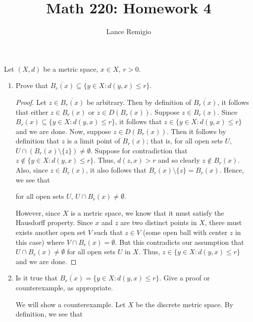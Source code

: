 \documentclass[a4paper]{article}
\title{Math 220: Homework 4}
\author{Lance Remigio}
\begin{document}
\maketitle

\begin{problem}
   Let \( (X,d) \) be a metric space, \( x \in X  \), \( r > 0  \). 
   \begin{enumerate}
       \item[(i)] Prove that \( \overline{{B}_{r}(x)} \subseteq \{ y \in X : d(y,x) \leq r  \}  \).
           \begin{proof}
               Let \( z \in \overline{{B}_{r}(x)} \) be arbitrary. Then by definition of \( \overline{{B}_{r}(x)} \), it follows that either \( z \in {B}_{r}(x)  \) or \( z \in D({B}_{r}(x)) \). Suppose \( z \in {B}_{r}(x) \). Since \( {B}_{r}(x) \subseteq \{ y \in X : d(y,x) \leq r  \}  \), it follows that \( z \in \{ y \in X : d(y,x) \leq r  \}  \) and we are done. Now, suppose \( z \in D({B}_{r}(x)) \). Then it follows by definition that \( z  \) is a limit point of \( {B}_{r}(x) \); that is, for all open sets \( U  \), \( U \cap ({B}_{r}(x) \setminus  \{ z \} ) \neq \emptyset \). Suppose for contradiction that \( z \notin \{ y \in X : d(y,x) \leq r  \}  \). Thus, \( d(z,x) > r  \) and so clearly \( z \notin {B}_{r}(x) \). Also, since \( z \in {B}_{r}(x) \), it also follows that \( {B}_{r}(x) \setminus  \{ z  \}  = {B}_{r}(x) \). 
Hence, we see that
              \begin{center}
                    for all open sets \( U  \), \( U \cap {B}_{r}(x) \neq \emptyset \).
              \end{center}
               However, since \( X  \) is a metric space, we know that it must satisfy the Hausdorff property. Since \( x  \) and \( z  \) are two distinct points in \( X  \), there must exists another open set \( V  \) such that \( z \in V  \) (some open ball with center \( z  \) in this case) where \( V \cap {B}_{r}(x) = \emptyset \). But this contradicts our assumption that \( U \cap {B}_{r}(x) \neq \emptyset \) for all open sets \( U  \) in \( X  \). Thus, \( z \in \{ y \in X : d(y,x) \leq r  \}  \) and we are done.
           \end{proof}
        \item[(ii)] Is it true that \( \overline{{B}_{r}(x)} = \{ y \in X : d(y,x) \leq r  \}  \). Give a proof or counterexample, as appropriate.
            \begin{solution}
            We will show a counterexample. Let \( X  \) be the discrete metric space. By definition, we see that  

\end{solution}
\end{enumerate}
\end{problem}
\end{document}
